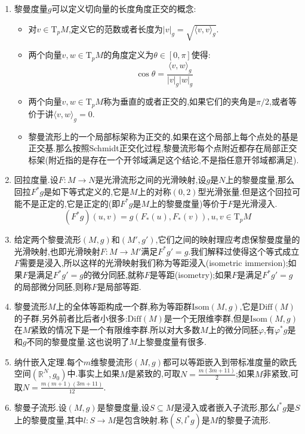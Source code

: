\begin{enumerate}
\begin{proof}
		设$M$是光滑流形,选取单位分解$\{U_{\alpha},\psi_{\alpha}\}$.约定这里每个$U_{\alpha}$都是坐标邻域,坐标变换记作$\varphi_{\alpha}$.在每个$U_{\alpha}$上有黎曼度量$g_{\alpha}=\varphi_{\alpha}^*\overline{g}$,其中$\overline{g}$是$\mathbb{R}^n$上的标准度量,换句话讲如果记$(U_{\alpha},\varphi_{\alpha})$的坐标是$(x^i)$,那么$g_{\alpha}=\sum_{i,j}\mathrm{d}x^i\mathrm{d}x^j$.下面定义$g=\sum_{\alpha}\psi_{\alpha}g_{\alpha}$.这有意义因为单位分解要求了每个点的附近这个求和只有至多有限项非零,于是这的确是一个光滑张量场,对称和正定是因为每个$g_{\alpha}$是对称正定的.
	\end{proof}
    \item 黎曼度量$g$可以定义切向量的长度角度正交的概念:
    \begin{itemize}
    	\item 对$v\in\mathrm{T}_pM$,定义它的范数或者长度为$|v|_g=\sqrt{\langle v,v\rangle_g}$.
    	\item 两个向量$v,w\in\mathrm{T}_pM$的角度定义为$\theta\in[0,\pi]$使得:
    	$$\cos\theta=\frac{\langle v,w\rangle_g}{|v|_g|w|_g}$$
    	\item 两个向量$v,w\in\mathrm{T}_pM$称为垂直的或者正交的,如果它们的夹角是$\pi/2$,或者等价于讲$\langle v,w\rangle_g=0$.
    	\item 黎曼流形上的一个局部标架称为正交的,如果在这个局部上每个点处的基是正交基.那么按照Schmidt正交化过程,黎曼流形每个点附近都存在局部正交标架(附近指的是存在一个开邻域满足这个结论,不是指任意开邻域都满足).
    \end{itemize}
    \item 回拉度量.设$F:M\to N$是光滑流形之间的光滑映射,设$g$是$N$上的黎曼度量,那么回拉$F^*g$是如下等式定义的,它是$M$上的对称$(0,2)$型光滑张量.但是这个回拉可能不是正定的,它是正定的(即$F^*g$是$M$上的黎曼度量)等价于$F$是光滑浸入.
    $$(F^*g)(u,v)=g(F_*(u),F_*(v)),u,v\in\mathrm{T}_pM$$
    \item 给定两个黎曼流形$(M,g)$和$(M',g')$,它们之间的映射理应考虑保黎曼度量的光滑映射,也即光滑映射$F:M\to M'$满足$F^*g'=g$.我们解释过使得这个等式成立$F$需要是浸入,所以这样的光滑映射我们称为等距浸入(isometric immersion);如果$F$是满足$F^*g'=g$的微分同胚,就称$F$是等距(isometry);如果$F$是满足$F^*g'=g$的局部微分同胚,则称$F$是局部等距.
    \item 黎曼流形$M$上的全体等距构成一个群,称为等距群$\mathrm{Isom}(M,g)$,它是$\mathrm{Diff}(M)$的子群,另外前者比后者小很多:$\mathrm{Diff}(M)$是一个无限维李群,但是$\mathrm{Isom}(M,g)$在$M$紧致的情况下是一个有限维李群.所以对大多数$M$上的微分同胚$\varphi$,有$\varphi^*g$是和$g$不同的黎曼度量.这也说明了$M$上黎曼度量有很多.
    \item 纳什嵌入定理.每个$m$维黎曼流形$(M,g)$都可以等距嵌入到带标准度量的欧氏空间$(\mathbb{R}^N,g_0)$中.事实上如果$M$是紧致的,可取$N=\frac{m(3m+11)}{2}$;如果$M$非紧致,可取$N=\frac{m(m+1)(3m+11)}{12}$.
    \item 黎曼子流形.设$(M,g)$是黎曼度量,设$S\subseteq M$是浸入或者嵌入子流形,那么$l^*g$是$S$上的黎曼度量,其中$l:S\to M$是包含映射.称$(S,l^*g)$是$M$的黎曼子流形.
\end{enumerate}

